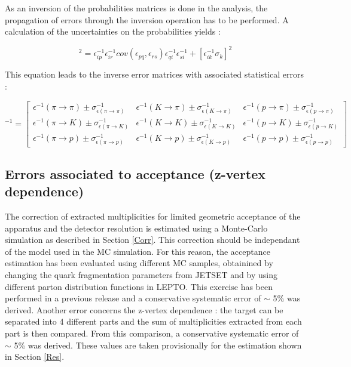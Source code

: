 \documentclass[letterpaper,12pt]{article}
\begin{document}
As an inversion of the probabilities matrices is done in the analysis, the propagation of errors through the
inversion operation has to be performed. A calculation of the uncertainties on the probabilities yields \cite{} :

\begin{equation}
  [\sigma^{-1}_i]^2 = \epsilon^{-1}_{ip}\epsilon^{-1}_{ir}cov(\epsilon_{pq},\epsilon_{rs})\epsilon^{-1}_{qi}\epsilon^{-1}_{si} + [\epsilon^{-1}_{ik}\sigma_k]^2
\end{equation}

This equation leads to the inverse error matrices with associated statistical errors :

\begin{equation}
[M^{\pm}_{RICH}]^{-1}
=
\begin{bmatrix}
\epsilon^{-1}(\pi \rightarrow \pi)\pm\sigma^{-1}_{\epsilon(\pi \rightarrow \pi)} & \epsilon^{-1}(K \rightarrow \pi)\pm\sigma^{-1}_{\epsilon(K \rightarrow \pi)} & \epsilon^{-1}(p \rightarrow \pi)\pm\sigma^{-1}_{\epsilon(p \rightarrow \pi)}\\
\epsilon^{-1}(\pi \rightarrow K)\pm\sigma^{-1}_{\epsilon(\pi \rightarrow K)} & \epsilon^{-1}(K \rightarrow K)\pm\sigma^{-1}_{\epsilon(K \rightarrow K)} & \epsilon^{-1}(p \rightarrow K)\pm\sigma^{-1}_{\epsilon(p \rightarrow K)} \\
\epsilon^{-1}(\pi \rightarrow p)\pm\sigma^{-1}_{\epsilon(\pi \rightarrow p)} & \epsilon^{-1}(K \rightarrow p)\pm\sigma^{-1}_{\epsilon(K \rightarrow p)} & \epsilon^{-1}(p \rightarrow p)\pm\sigma^{-1}_{\epsilon(p \rightarrow p)}
\end{bmatrix}
\end{equation}

\subsection{Errors associated to acceptance (z-vertex dependence)}

The correction of extracted multiplicities for limited geometric acceptance of the apparatus and the detector resolution is estimated using a Monte-Carlo simulation as described in Section \ref{Corr}. This correction should be independant of the model used in the MC simulation. For this reason, the acceptance estimation has been evaluated using different MC samples, obtainined by changing the quark fragmentation parameters from JETSET and by using different parton distribution functions in LEPTO. This exercise has been performed in a previous release \cite{} and a conservative systematic error of $\sim$ 5\% was derived.
Another error concerns the z-vertex dependence : the target can be separated into 4 different parts and the sum of multiplicities extracted from each part is then compared. From this comparison, a conservative systematic error of $\sim$ 5\% was derived.
These values are taken provisionally for the estimation shown in Section \ref{Res}.
\end{document}

